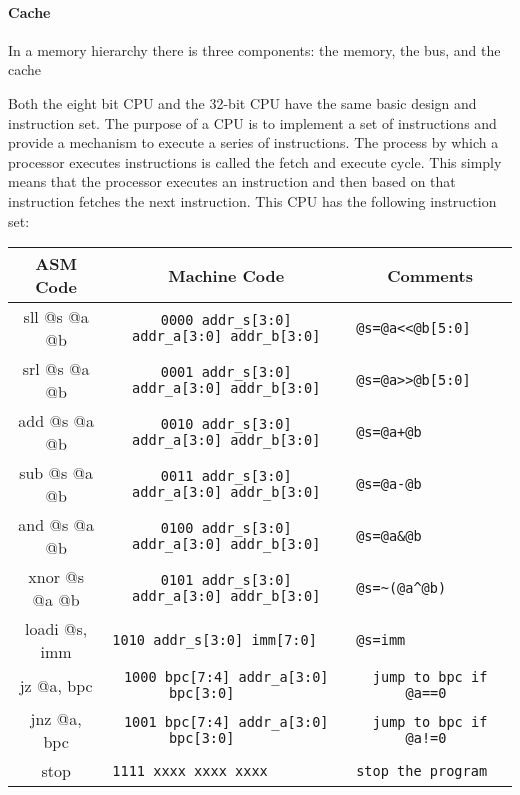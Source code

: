 \documentclass[11pt,letterpaper,final]{article}
\begin{document}
\paragraph{Cache}



In a memory hierarchy there is three components: the memory, the bus, and the cache


Both the eight bit CPU and the 32-bit CPU have the same basic design and instruction set. The purpose of a CPU is to implement a set of
instructions and provide a mechanism to execute a series of instructions. 
The process by which a processor executes instructions is called the fetch and
execute cycle.  This simply means that the processor executes an
instruction and then based on that instruction fetches the next instruction. 
This CPU has the following instruction set: \cite{instructions}

\begin{center} 
\begin{small}
\begin{tabular}{ | c | c | c | } 
\hline ASM Code      & Machine Code                             & Comments      
      \\
\hline sll @s @a @b  & \verb|0000 addr_s[3:0] addr_a[3:0] addr_b[3:0]| &
\verb|@s=@a<<@b[5:0]       |\\ 
\hline srl @s @a @b  & \verb|0001 addr_s[3:0] addr_a[3:0] addr_b[3:0]| &
\verb|@s=@a>>@b[5:0]       |\\ 
\hline add @s @a @b  & \verb|0010 addr_s[3:0] addr_a[3:0] addr_b[3:0]| &
\verb|@s=@a+@b             |\\ 
\hline sub @s @a @b  & \verb|0011 addr_s[3:0] addr_a[3:0] addr_b[3:0]| &
\verb|@s=@a-@b             |\\ 
\hline and @s @a @b  & \verb|0100 addr_s[3:0] addr_a[3:0] addr_b[3:0]| &
\verb|@s=@a&@b             |\\ 
\hline xnor @s @a @b & \verb|0101 addr_s[3:0] addr_a[3:0] addr_b[3:0]| &
\verb|@s=~(@a^@b)          |\\ 
\hline loadi @s, imm & \verb|1010 addr_s[3:0] imm[7:0]               | &
\verb|@s=imm               |\\ 
\hline jz @a, bpc    & \verb|1000 bpc[7:4] addr_a[3:0] bpc[3:0]      | &
\verb|jump to bpc if @a==0 |\\ 
\hline jnz @a, bpc   & \verb|1001 bpc[7:4] addr_a[3:0] bpc[3:0]      | &
\verb|jump to bpc if @a!=0 |\\ 
\hline stop          & \verb|1111 xxxx xxxx xxxx                     | &
\verb|stop the program     |\\ 
\hline
\end{tabular}
\end{small}
\end{center}
\end{document}
